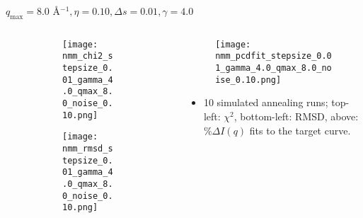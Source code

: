 \documentclass{beamer}
\begin{document}
\begin{frame}{$ q_{\textrm{max}}=8.0 $ \AA $^{-1}, \eta=0.10, \Delta s=0.01, \gamma=4.0$}
	\begin{columns}
		\begin{column}{.5\textwidth}
			\begin{figure}[H]
			\centering
			\begin{subfigure}[b]{\textwidth}
				\centering
				\texttt{[image: nmm\_chi2\_stepsize\_0.01\_gamma\_4.0\_qmax\_8.0\_noise\_0.10.png]}
				\label{fig:}
			\end{subfigure}
			\begin{subfigure}[b]{\textwidth}
				\centering
				\texttt{[image: nmm\_rmsd\_stepsize\_0.01\_gamma\_4.0\_qmax\_8.0\_noise\_0.10.png]}
				\label{fig:}
			\end{subfigure}
			\end{figure}
		\end{column}
		\begin{column}{.5\textwidth}
			\begin{figure}[H]
				\centering
				\texttt{[image: nmm\_pcdfit\_stepsize\_0.01\_gamma\_4.0\_qmax\_8.0\_noise\_0.10.png]}
				\label{fig:}
			\end{figure}
			\begin{itemize}
				\item 10 simulated annealing runs; top-left: $\chi^2$, bottom-left: RMSD, above: $\%\Delta I(q)$ fits to the target curve.
			\end{itemize}
		\end{column}
	\end{columns}
\end{frame}
 
\end{document}
